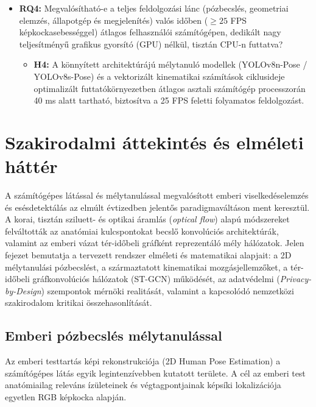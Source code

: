 \documentclass[12pt,a4paper,oneside]{report}
\begin{document}
\begin{itemize}
\begin{itemize}
    \end{itemize}
    \item \textbf{RQ4:} Megvalósítható-e a teljes feldolgozási lánc (pózbecslés, geometriai elemzés, állapotgép és megjelenítés) valós időben ($\ge 25$ FPS képkockasebességgel) átlagos felhasználói számítógépen, dedikált nagy teljesítményű grafikus gyorsító (GPU) nélkül, tisztán CPU-n futtatva?
    \begin{itemize}
        \item \textbf{H4:} A könnyített architektúrájú mélytanuló modellek (YOLOv8n-Pose / YOLOv8s-Pose) és a vektorizált kinematikai számítások ciklusideje optimalizált futtatókörnyezetben átlagos asztali számítógép processzorán 40 ms alatt tartható, biztosítva a 25 FPS feletti folyamatos feldolgozást.
    \end{itemize}
\end{itemize}

\chapter{Szakirodalmi áttekintés és elméleti háttér}

A számítógépes látással és mélytanulással megvalósított emberi viselkedéselemzés és esésdetektálás az elmúlt évtizedben jelentős paradigmaváltáson ment keresztül. A korai, tisztán sziluett- és optikai áramlás (\textit{optical flow}) alapú módszereket felváltották az anatómiai kulcspontokat becslő konvolúciós architektúrák, valamint az emberi vázat tér-időbeli gráfként reprezentáló mély hálózatok. Jelen fejezet bemutatja a tervezett rendszer elméleti és matematikai alapjait: a 2D mélytanulási pózbecslést, a származtatott kinematikai mozgásjellemzőket, a tér-időbeli gráfkonvolúciós hálózatok (ST-GCN) működését, az adatvédelmi (\textit{Privacy-by-Design}) szempontok mérnöki realitását, valamint a kapcsolódó nemzetközi szakirodalom kritikai összehasonlítását.

\section{Emberi pózbecslés mélytanulással}
Az emberi testtartás képi rekonstrukciója (2D Human Pose Estimation) a számítógépes látás egyik legintenzívebben kutatott területe. A cél az emberi test anatómiailag releváns ízületeinek és végtagpontjainak képsíki lokalizációja egyetlen RGB képkocka alapján.
\end{document}

